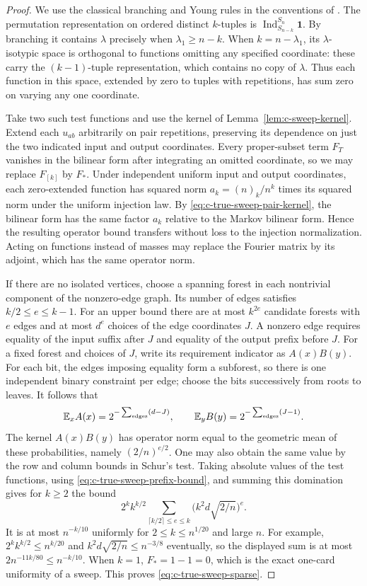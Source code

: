 \begin{proof}
We use the classical branching and Young rules in the conventions of
\cite{sagan,etingof}. The permutation representation on ordered distinct
$k$-tuples is $\operatorname{Ind}_{S_{n-k}}^{S_n}\mathbf1$.
By branching it contains $\lambda$ precisely when $\lambda_1\ge n-k$.
When $k=n-\lambda_1$, its $\lambda$-isotypic space is orthogonal to
functions omitting any specified coordinate: these carry the
$(k-1)$-tuple representation, which contains no copy of $\lambda$.
Thus each function in this space, extended by zero to tuples with
repetitions, has sum zero on varying any one coordinate.

Take two such test functions and use the kernel of
Lemma~\ref{lem:c-sweep-kernel}. Extend each $u_{ab}$ arbitrarily on
pair repetitions, preserving its dependence on just the two indicated
input and output coordinates. Every proper-subset term $F_T$ vanishes
in the bilinear form after integrating an omitted coordinate, so we
may replace $F_{[k]}$ by $F_*$.
Under independent uniform input and output coordinates, each
zero-extended function has squared norm $a_k=(n)_k/n^k$ times its
squared norm under the uniform injection law. By
\eqref{eq:c-true-sweep-pair-kernel}, the bilinear form has the same
factor $a_k$ relative to the Markov bilinear form. Hence the resulting
operator bound transfers without loss to the injection normalization.
Acting on functions instead of masses may replace the Fourier matrix
by its adjoint, which has the same operator norm.

If there are no isolated vertices, choose a spanning forest in each
nontrivial component of the nonzero-edge graph.  Its number of edges
satisfies $k/2\le e\le k-1$.  For an upper bound there are at most
$k^{2e}$ candidate forests with $e$ edges and at most $d^e$ choices of
the edge coordinates $J$.  A nonzero edge requires equality of the
input suffix after $J$ and equality of the output prefix before $J$.
For a fixed forest and choices of $J$, write its requirement indicator
as $A(x)B(y)$.  For each bit, the edges imposing equality form a
subforest, so there is one independent binary constraint per edge;
choose the bits successively from roots to leaves.  It follows that
\[
 \mathbb E_x A(x)=2^{-\sum_{\rm edges}(d-J)},\qquad
 \mathbb E_y B(y)=2^{-\sum_{\rm edges}(J-1)}.
\]
The kernel $A(x)B(y)$ has operator norm equal to the geometric mean
of these probabilities, namely $(2/n)^{e/2}$.  One may also obtain the
same value by the row and column bounds in Schur's test.
Taking absolute values of the test functions, using
\eqref{eq:c-true-sweep-prefix-bound}, and summing this domination gives
for $k\ge2$ the bound
\[
 2^k k^{k/2}
   \sum_{\lceil k/2\rceil\le e\le k}
       \bigl(k^2d\sqrt{2/n}\bigr)^e.
\]
It is at most $n^{-k/10}$ uniformly for $2\le k\le n^{1/20}$ and
large $n$.  For example,
$2^k k^{k/2}\le n^{k/20}$ and
$k^2d\sqrt{2/n}\le n^{-3/8}$ eventually, so the displayed sum is
at most $2n^{-11k/80}\le n^{-k/10}$.  When $k=1$, $F_*=1-1=0$,
which is the exact one-card uniformity of a sweep.  This proves
\eqref{eq:c-true-sweep-sparse}.


\end{proof}
